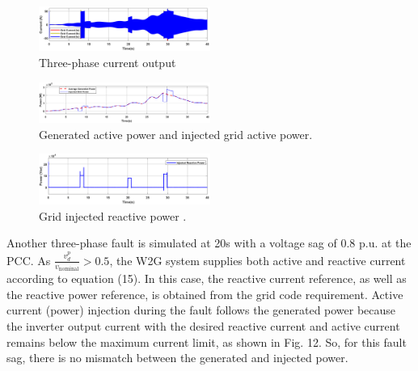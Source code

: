 \documentclass[conference]{IEEEtran}
\begin{document}
\begin{figure}[h!]
    \centering
    \includegraphics[width=0.5\textwidth]{Figs/5_3_1/current.png}
    \caption{Three-phase current output}
    \label{fig:LPMG_position_velocity}
\end{figure}
\begin{figure}[h!]
    \centering
    \includegraphics[width=0.5\textwidth]{Figs/5_3_1/active power lvrt.png}
    \caption{Generated active power and injected grid active power.}
    \label{fig:W2G_normal_grid}
\end{figure}

\begin{figure}[h!]
    \centering
    \includegraphics[width=0.5\textwidth]{Figs/5_3_1/reactive power lvrt.png}
    \caption{Grid injected reactive power .}
    \label{fig:LPMG_position_velocity}
\end{figure}

Another three-phase fault is simulated at 20s with a voltage sag of 0.8 p.u. at the PCC. As \( \frac{v_d^p}{v_{\text{nominal}}} > 0.5 \), the W2G system supplies both active and reactive current according to equation (15). In this case, the reactive current reference, as well as the reactive power reference, is obtained from the grid code requirement. Active current (power) injection during the fault follows the generated power because the inverter output current with the desired reactive current and active current remains below the maximum current limit, as shown in Fig. 12. So, for this fault sag, there is no mismatch between the generated and injected power.
\end{document}
